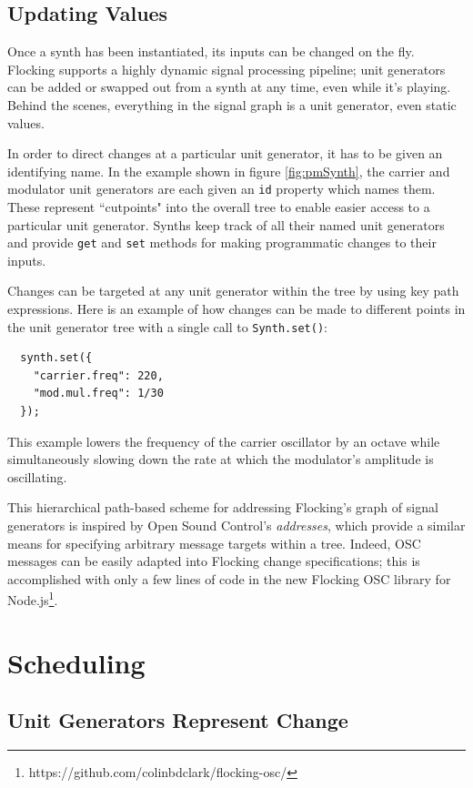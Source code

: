 \documentclass{article}
\begin{document}
\subsection{Updating Values}

Once a synth has been instantiated, its inputs can be changed on the fly. Flocking supports a highly dynamic signal processing pipeline; unit generators can be added or swapped out from a synth at any time, even while it's playing. Behind the scenes, everything in the signal graph is a unit generator, even static values.

In order to direct changes at a particular unit generator, it has to be given an identifying name. In the example shown in figure \ref{fig:pmSynth}, the carrier and modulator unit generators are each given an \verb|id| property which names them. These represent ``cutpoints" into the overall tree to enable easier access to a particular unit generator. Synths keep track of all their named unit generators and provide \verb|get| and \verb|set| methods for making programmatic changes to their inputs.

Changes can be targeted at any unit generator within the tree by using key path expressions. Here is an example of how changes can be made to different points in the unit generator tree with a single call to \verb|Synth.set()|:

\begin{verbatim}
  synth.set({
    "carrier.freq": 220,
    "mod.mul.freq": 1/30
  });
\end{verbatim}

This example lowers the frequency of the carrier oscillator by an octave while simultaneously slowing down the rate at which the modulator's amplitude is oscillating.

This hierarchical path-based scheme for addressing Flocking's graph of signal generators is inspired by Open Sound Control's {\it addresses}, which provide a similar means for specifying arbitrary message targets within a tree. Indeed, OSC messages can be easily adapted into Flocking change specifications; this is accomplished with only a few lines of code in the new Flocking OSC library for Node.js\footnote{https://github.com/colinbdclark/flocking-osc/}.

\section{Scheduling} \label{sec:Scheduling}

\subsection{Unit Generators Represent Change}
\end{document}
